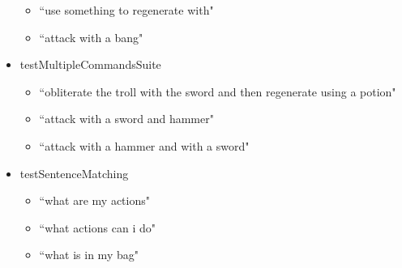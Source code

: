\documentclass[11pt]{article}
\begin{document}
\begin{appendices}
\begin{scriptsize}
\begin{itemize}
\begin{itemize}
	\item ``use something to regenerate with"
	\item ``attack with a bang"
	\end{itemize}
\item testMultipleCommandsSuite
	\begin{itemize}
	\item ``obliterate the troll with the sword and then regenerate using a potion"
	\item ``attack with a sword and hammer"
	\item ``attack with a hammer and with a sword"
	\end{itemize}
\item testSentenceMatching
	\begin{itemize}
	\item ``what are my actions"
	\item ``what actions can i do"
	\item ``what is in my bag"
	\end{itemize}
\end{itemize}
\end{scriptsize}


\end{appendices}
\end{document}
